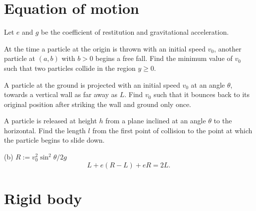 \documentclass{../../large}
\begin{document}
\section{Equation of motion}
\begin{prb}
Let $e$ and $g$ be the coefficient of restitution and gravitational acceleration. 
\begin{parts}
\item At the time a particle at the origin is thrown with an initial speed $v_0$, another particle at $(a,b)$ with $b>0$ begins a free fall. Find the minimum value of $v_0$ such that two particles collide in the region $y\ge0$.
\item A particle at the ground is projected with an initial speed $v_0$ at an angle $\theta$, towards a vertical wall as far away as $L$. Find $v_0$ such that it bounces back to its original position after striking the wall and ground only once. 
\item A particle is released at height $h$ from a plane inclined at an angle $\theta$ to the horizontal. Find the length $l$ from the first point of collision to the point at which the particle begins to slide down.
\end{parts}
\end{prb}
\begin{sol}
(b)
$R:=v_0^2\sin^2\theta/2g$
\[L+e(R-L)+eR=2L.\]
\end{sol}

\begin{prb}
\end{prb}
\begin{prb}[Tension]
\end{prb}
\begin{prb}[Pulley]
\end{prb}
\begin{prb}[Friction]
\end{prb}


\section{Rigid body}

\begin{prb}[Equilibrium]
\end{prb}
\begin{prb}
\end{prb}
\begin{prb}
\end{prb}
\end{document}

